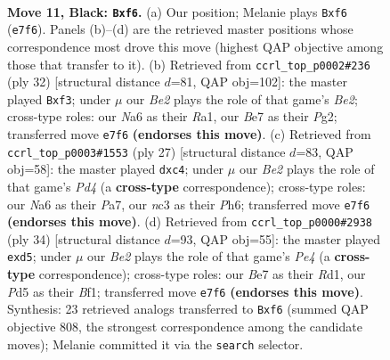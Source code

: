 \documentclass[11pt]{article}
\begin{document}
\begin{figure}[p]
\label{fig:thought-m19}
\end{figure}

\clearpage

\begin{figure}[p]\centering
\begin{subfigure}{0.46\textwidth}\centering
\resizebox{\linewidth}{!}{%
\newchessgame
\chessboard[
  setfen={r2qk2r/pp2bp1p/n3pBp1/3p4/P2P2P1/2N2Q1P/1PP2P2/R3KB1R b KQkq - 0 11},
  showmover=false,
  pgfstyle=straightmove, color=movearrow, markmove={e7-f6}
]}
\caption{}
\end{subfigure}\hfill
\begin{subfigure}{0.46\textwidth}\centering
\resizebox{\linewidth}{!}{%
\newchessgame
\chessboard[
  setfen={r2r2k1/ppp2pp1/5q1p/2Pp4/3P3n/P3Pb2/4BPPP/R2Q1RK1 w - - 0 17},
  showmover=false,
  pgfstyle=straightmove, color=movearrow, markmove={e2-f3}
]}
\caption{}
\end{subfigure}
\\[4pt]
\begin{subfigure}{0.46\textwidth}\centering
\resizebox{\linewidth}{!}{%
\newchessgame
\chessboard[
  setfen={r1bqk2r/pp3p2/4p1pp/2Pp4/2BQ3P/2P5/P1PK1PP1/R5NR b kq - 0 14},
  showmover=false,
  pgfstyle=straightmove, color=movearrow, markmove={d5-c4}
]}
\caption{}
\end{subfigure}\hfill
\begin{subfigure}{0.46\textwidth}\centering
\resizebox{\linewidth}{!}{%
\newchessgame
\chessboard[
  setfen={2r1kb1r/5pp1/pq1p1n1p/1p1bp3/4P1P1/1N3P2/PPP4P/1K1RQB1R w k - 0 18},
  showmover=false,
  pgfstyle=straightmove, color=movearrow, markmove={e4-d5}
]}
\caption{}
\end{subfigure}
\caption{\textbf{Move 11, Black: \texttt{Bxf6}.} (a) Our position; Melanie plays \texttt{Bxf6} (\texttt{e7f6}). Panels (b)--(d) are the retrieved master positions whose correspondence most drove this move (highest QAP objective among those that transfer to it). (b) Retrieved from \texttt{ccrl\_top\_p0002\#236} (ply 32) [structural distance $d$=81, QAP obj=102]: the master played \texttt{Bxf3}; under $\mu$ our \emph{Be2} plays the role of that game's \emph{Be2}; cross-type roles: our \emph{N}a6 as their \emph{R}a1, our \emph{B}e7 as their \emph{P}g2; transferred move \texttt{e7f6} \textbf{(endorses this move)}. (c) Retrieved from \texttt{ccrl\_top\_p0003\#1553} (ply 27) [structural distance $d$=83, QAP obj=58]: the master played \texttt{dxc4}; under $\mu$ our \emph{Be2} plays the role of that game's \emph{Pd4} (a \textbf{cross-type} correspondence); cross-type roles: our \emph{N}a6 as their \emph{P}a7, our \emph{n}c3 as their \emph{P}h6; transferred move \texttt{e7f6} \textbf{(endorses this move)}. (d) Retrieved from \texttt{ccrl\_top\_p0000\#2938} (ply 34) [structural distance $d$=93, QAP obj=55]: the master played \texttt{exd5}; under $\mu$ our \emph{Be2} plays the role of that game's \emph{Pe4} (a \textbf{cross-type} correspondence); cross-type roles: our \emph{B}e7 as their \emph{R}d1, our \emph{P}d5 as their \emph{B}f1; transferred move \texttt{e7f6} \textbf{(endorses this move)}. Synthesis: 23 retrieved analogs transferred to \texttt{Bxf6} (summed QAP objective 808, the strongest correspondence among the candidate moves); Melanie committed it via the \texttt{search} selector.}

\end{figure}
\end{document}
